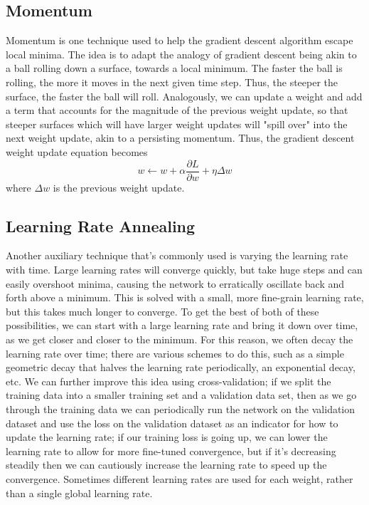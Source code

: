 \documentclass{article}
\begin{document}
\subsection{Momentum}
Momentum is one technique used to help the gradient descent algorithm escape local minima. The idea is to adapt the analogy of gradient descent being akin to a ball rolling down a surface, towards a local minimum. The faster the ball is rolling, the more it moves in the next given time step. Thus, the steeper the surface, the faster the ball will roll. Analogously, we can update a weight and add a term that accounts for the magnitude of the previous weight update, so that steeper surfaces which will have larger weight updates will "spill over" into the next weight update, akin to a persisting momentum. Thus, the gradient descent weight update equation becomes
$$ w \gets w + \alpha \frac{\partial L}{\partial w} + \eta \Delta w $$
where $ \Delta w $ is the previous weight update. 

\subsection{Learning Rate Annealing}
Another auxiliary technique that's commonly used is varying the learning rate with time. Large learning rates will converge quickly, but take huge steps and can easily overshoot minima, causing the network to erratically oscillate back and forth above a minimum. This is solved with a small, more fine-grain learning rate, but this takes much longer to converge. To get the best of both of these possibilities, we can start with a large learning rate and bring it down over time, as we get closer and closer to the minimum. For this reason, we often decay the learning rate over time; there are various schemes to do this, such as a simple geometric decay that halves the learning rate periodically, an exponential decay, etc. We can further improve this idea using cross-validation; if we split the training data into a smaller training set and a validation data set, then as we go through the training data we can periodically run the network on the validation dataset and use the loss on the validation dataset as an indicator for how to update the learning rate; if our training loss is going up, we can lower the learning rate to allow for more fine-tuned convergence, but if it's decreasing steadily then we can cautiously increase the learning rate to speed up the convergence. Sometimes different learning rates are used for each weight, rather than a single global learning rate.
\end{document}
